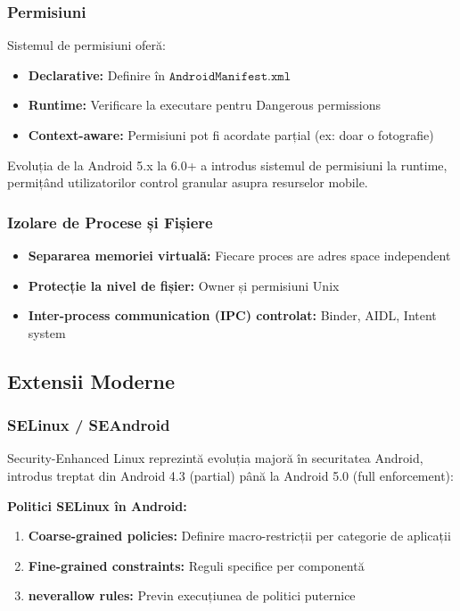 \documentclass[11pt,a4paper,twocolumn]{article}
\theoremstyle{definition}
\theoremstyle{plain}
\theoremstyle{remark}
\begin{document}
\subsubsection{Permisiuni}
Sistemul de permisiuni oferă:
\begin{itemize}
    \item \textbf{Declarative:} Definire în $\texttt{AndroidManifest.xml}$
    \item \textbf{Runtime:} Verificare la executare pentru Dangerous permissions
    \item \textbf{Context-aware:} Permisiuni pot fi acordate parțial (ex: doar o fotografie)
\end{itemize}

Evoluția de la Android 5.x la 6.0+ a introdus sistemul de permisiuni la runtime, 
permițând utilizatorilor control granular asupra resurselor mobile.

\subsubsection{Izolare de Procese și Fișiere}
\begin{itemize}
    \item \textbf{Separarea memoriei virtuală:} Fiecare proces are adres space independent
    \item \textbf{Protecție la nivel de fișier:} Owner și permisiuni Unix
    \item \textbf{Inter-process communication (IPC) controlat:} Binder, AIDL, Intent system
\end{itemize}

\subsection{Extensii Moderne}

\subsubsection{SELinux / SEAndroid}
Security-Enhanced Linux reprezintă evoluția majoră în securitatea Android, introdus 
treptat din Android 4.3 (partial) până la Android 5.0 (full enforcement):

\textbf{Politici SELinux în Android:}
\begin{enumerate}
    \item \textbf{Coarse-grained policies:} Definire macro-restricții per categorie de aplicații
    \item \textbf{Fine-grained constraints:} Reguli specifice per componentă
    \item \textbf{neverallow rules:} Previn execuțiunea de politici puternice
\end{enumerate}
\end{document}
